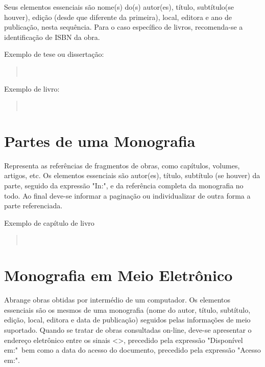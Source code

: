 \documentclass[repeatfields,xlists,xpacks,oneside]{ufrgscca}
\begin{document}
\begin{appendix}
Seus elementos essenciais são nome(s) do(s) autor(es), título, subtítulo(se
houver), edição (desde que diferente da primeira), local, editora e ano de
publicação, nesta sequência. Para o caso específico de livros,
recomenda-se a identificação de ISBN da obra.

Exemplo de tese ou dissertação:\\

\begin{quote}\noindent{}\\\end{quote}

Exemplo de livro:\\

\begin{quote}\noindent{}\\\end{quote}


\section{Partes de uma Monografia}

Representa as referências de fragmentos de obras, como capítulos, volumes,
artigos, etc. Os elementos essenciais são autor(es), título, subtítulo (se
houver) da parte, seguido da expressão "In:", e da referência completa da
monografia no todo. Ao final deve-se informar a paginação ou individualizar
de outra forma a parte referenciada.

Exemplo de capítulo de livro\\

\begin{quote}\noindent{}\\\end{quote}


\section{Monografia em Meio Eletrônico}

Abrange obras obtidas por intermédio de um computador. Os elementos
essenciais são os mesmos de uma monografia (nome do autor, título,
subtítulo, edição, local, editora e data de publicação) seguidos pelas
informações de meio suportado. Quando se tratar de obras consultadas
on-line, deve-se apresentar o endereço eletrônico entre os sinais <>,
precedido pela expressão "Disponível em:"\ bem como a data do acesso do
documento, precedido pela expressão "Acesso em:".


\end{appendix}
\end{document}
